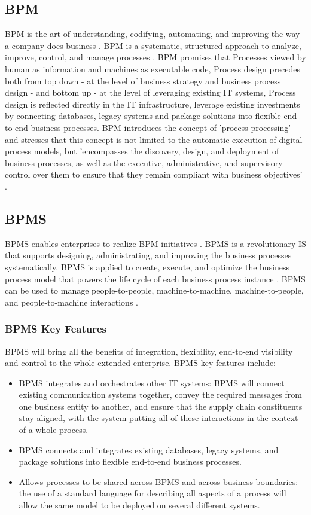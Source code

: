 \documentclass[12pt,a4paper,final,twoside,onecolumn,titlepage]{book}
\begin{document}
\subsection{BPM}
\gls{BPM} is the art of understanding, codifying, automating, and improving the way a company does business \cite{BS04}. \gls{BPM} is a systematic, structured approach to analyze, improve, control, and manage processes \cite{BS02}. \gls{BPM} promises that Processes viewed by human as information and machines as executable code, Process design precedes both from top down - at the level of business strategy and business process design - and bottom up - at the level of leveraging existing IT systems, Process design is reflected directly in the IT infrastructure, leverage existing investments by connecting databases, legacy systems and package solutions into flexible end-to-end business processes. \gls{BPM} introduces the concept of 'process processing' and stresses that this concept is not limited to the automatic execution of digital process models, but 'encompasses the discovery, design, and deployment of business processes, as well as the executive, administrative, and supervisory control over them to ensure that they remain compliant with business objectives' \cite{BS06,BS23}.

\subsection{BPMS}
\gls{BPMS} enables enterprises to realize \gls{BPM} initiatives \cite{BS05}. \gls{BPMS} is a revolutionary \gls{IS} that supports designing, administrating, and improving the business processes systematically. \gls{BPMS} is applied to create, execute, and optimize the business process model that powers the life cycle of each business process instance \cite{BS24}. \gls{BPMS} can be used to manage people-to-people, machine-to-machine, machine-to-people, and people-to-machine interactions \cite{BS25}.
\subsubsection{BPMS Key Features}
\gls{BPMS} will bring all the benefits of integration, flexibility, end-to-end visibility and control to the whole extended enterprise. \gls{BPMS} key features include:
\begin{itemize}
\item \gls{BPMS} integrates and orchestrates other IT systems: \gls{BPMS} will connect existing communication systems together, convey the required messages from one business entity to another, and ensure that the supply chain constituents stay aligned, with the system putting all of these interactions in the context of a whole process.
\item \gls{BPMS} connects and integrates existing databases, legacy systems, and package solutions into flexible end-to-end business processes.
\item Allows processes to be shared across \gls{BPMS} and across business boundaries: the use of a standard language for describing all aspects of a process will allow the same model to be deployed on several different systems.
\end{itemize}
\end{document}

